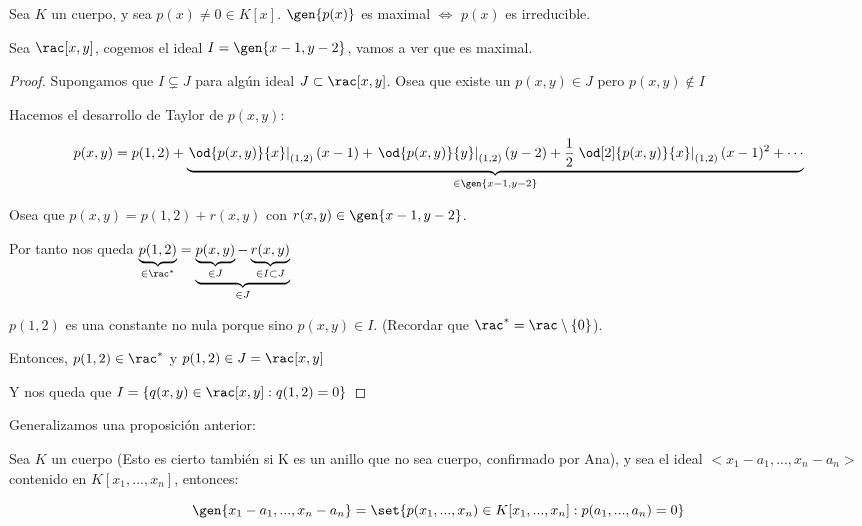 \begin{prop}
Sea $K$ un cuerpo, y sea $p(x)\neq 0 \in K[x]$. $\gen{p(x)}$ es maximal $\Leftrightarrow$ $p(x)$ es irreducible.
\end{prop}

\begin{example}
Sea $\rac[x,y]$, cogemos el ideal $I=\gen{x-1,y-2}$, vamos a ver que es maximal.

\begin{proof}
	Supongamos que $I \subsetneq J$ para algún ideal $J \subset \rac[x,y]$. Osea que existe un $p(x,y) \in J$ pero $p(x,y) \notin I$

	Hacemos el desarrollo de Taylor de $p(x,y)$:

	$$ p(x,y)=p(1,2) + \underbrace{\left.\od{p(x,y)}{x}\right|_{(1,2)} (x-1)+ \left.\od{p(x,y)}{y}\right|_{(1,2)} (y-2)+\frac{1}{2}\left.\od[2]{p(x,y)}{x}\right|_{(1,2)} (x-1)^2+ \dotsb }_{\in \gen{x-1,y-2}}$$

	Osea que $p(x,y)=p(1,2)+r(x,y)$ con $r(x,y) \in \gen{x-1,y-2}$.

	Por tanto nos queda $\underbrace{p(1,2)}_{\in \rac^*}=\underbrace{\underbrace{p(x,y)}_{\in J}-\underbrace{r(x,y)}_{\in I \subset J}}_{\in J}$

	$p(1,2)$ es una constante no nula porque sino $p(x,y) \in I$. (Recordar que $\rac^*=\rac\setminus\{0\}$).

	Entonces, $p(1,2) \in \rac^*$ y $p(1,2) \in J =\rac[x,y]$

	Y nos queda que $I=\{ q(x,y) \in \rac[x,y]: q(1,2)=0 \}$
\end{proof}
\end{example}

Generalizamos una proposición anterior:
\begin{prop}
	Sea $K$ un cuerpo (Esto es cierto también si K es un anillo que no sea cuerpo, confirmado por Ana), y sea el ideal $<x_1-a_1,...,x_n-a_n>$ contenido en $K[x_1,...,x_n]$, entonces:

	$$\gen{x_1-a_1,...,x_n-a_n}=\set{p(x_1,...,x_n)\in K[x_1,...,x_n]:p(a_1,...,a_n)=0 }$$
\end{prop}

